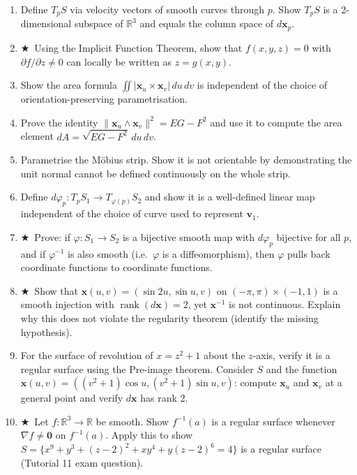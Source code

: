 \documentclass[11pt, a4paper]{article}
\newcommand{\R}{\mathbb{R}}
\DeclareMathOperator{\rank}{rank}
\newcommand{\hard}{$\bigstar$\ }
\begin{document}
\begin{enumerate}[label=\textbf{Q\arabic*.}, leftmargin=*, itemsep=6pt]
\item Define $T_pS$ via velocity vectors of smooth curves through $p$. Show $T_pS$ is a 2-dimensional subspace of $\R^3$ and equals the column space of $d\mathbf{x}_p$.

\item \hard Using the Implicit Function Theorem, show that $f(x,y,z)=0$ with $\partial f/\partial z\neq 0$ can locally be written as $z=g(x,y)$.

\item Show the area formula $\iint|\mathbf{x}_u\times\mathbf{x}_v|\,du\,dv$ is independent of the choice of orientation-preserving parametrisation.

\item Prove the identity $\|\mathbf{x}_u\wedge\mathbf{x}_v\|^2=EG-F^2$ and use it to compute the area element $dA=\sqrt{EG-F^2}\,du\,dv$.

\item Parametrise the M\"obius strip. Show it is not orientable by demonstrating the unit normal cannot be defined continuously on the whole strip.

\item Define $d\varphi_p:T_pS_1\to T_{\varphi(p)}S_2$ and show it is a well-defined linear map independent of the choice of curve used to represent $\mathbf{v}_1$.

\item \hard Prove: if $\varphi:S_1\to S_2$ is a bijective smooth map with $d\varphi_p$ bijective for all $p$, and if $\varphi^{-1}$ is also smooth (i.e.\ $\varphi$ is a diffeomorphism), then $\varphi$ pulls back coordinate functions to coordinate functions.

\item \hard Show that $\mathbf{x}(u,v)=(\sin 2u,\sin u, v)$ on $(-\pi,\pi)\times(-1,1)$ is a smooth injection with $\rank(d\mathbf{x})=2$, yet $\mathbf{x}^{-1}$ is not continuous. Explain why this does not violate the regularity theorem (identify the missing hypothesis).

\item For the surface of revolution of $x=z^2+1$ about the $z$-axis, verify it is a regular surface using the Pre-image theorem. Consider $S$ and the function $\mathbf{x}(u,v)=((v^2+1)\cos u,(v^2+1)\sin u,v)$: compute $\mathbf{x}_u$ and $\mathbf{x}_v$ at a general point and verify $d\mathbf{x}$ has rank 2.

\item \hard Let $f:\R^3\to\R$ be smooth. Show $f^{-1}(a)$ is a regular surface whenever $\nabla f\neq\mathbf{0}$ on $f^{-1}(a)$. Apply this to show $S=\{x^9+y^3+(z-2)^2+xy^4+y(z-2)^6=4\}$ is a regular surface (Tutorial 11 exam question).


\end{enumerate}
\end{document}
